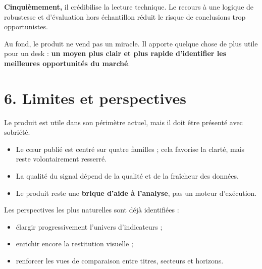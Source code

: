 \documentclass[11pt,a4paper]{article}
\begin{document}
\textbf{Cinquièmement,} il crédibilise la lecture technique. Le recours à une logique de robustesse et d'évaluation hors échantillon réduit le risque de conclusions trop opportunistes.

Au fond, le produit ne vend pas un miracle. Il apporte quelque chose de plus utile pour un desk : \textbf{un moyen plus clair et plus rapide d'identifier les meilleures opportunités du marché}.

\section*{6. Limites et perspectives}

Le produit est utile dans son périmètre actuel, mais il doit être présenté avec sobriété.

\begin{itemize}
\item Le cœur publié est centré sur quatre familles ; cela favorise la clarté, mais reste volontairement resserré.
\item La qualité du signal dépend de la qualité et de la fraîcheur des données.
\item Le produit reste une \textbf{brique d'aide à l'analyse}, pas un moteur d'exécution.
\end{itemize}

Les perspectives les plus naturelles sont déjà identifiées :

\begin{itemize}
\item élargir progressivement l'univers d'indicateurs ;
\item enrichir encore la restitution visuelle ;
\item renforcer les vues de comparaison entre titres, secteurs et horizons.
\end{itemize}

\vspace{0.7em}
\end{document}
